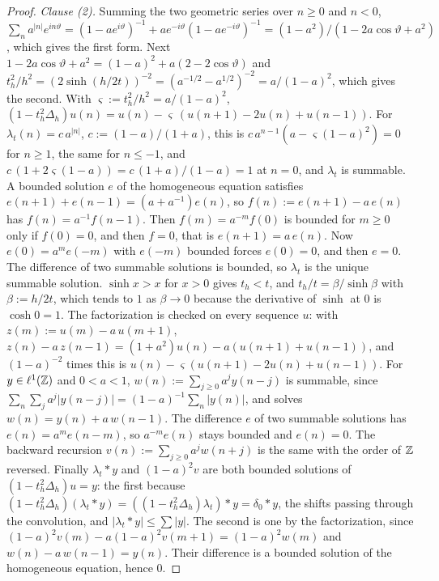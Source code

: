 \begin{proof}
\emph{Clause (2).} Summing the two geometric series over $n \ge 0$ and $n < 0$,
$\sum_na^{|n|}e^{in\vartheta} = (1 - ae^{i\vartheta})^{-1} + ae^{-i\vartheta}(1 - ae^{-i\vartheta})^{-1}
= (1-a^2)/(1 - 2a\cos\vartheta + a^2)$, which gives the first form. Next
$1 - 2a\cos\vartheta + a^2 = (1-a)^2 + a(2 - 2\cos\vartheta)$ and
$t_h^2/h^2 = (2\sinh(h/2t))^{-2} = (a^{-1/2} - a^{1/2})^{-2} = a/(1-a)^2$, which gives the second.
With $\varsigma := t_h^2/h^2 = a/(1-a)^2$,
$(1 - t_h^2\Delta_h)u(n) = u(n) - \varsigma\,(u(n+1) - 2u(n) + u(n-1))$.
For $\lambda_t(n) = c\,a^{|n|}$, $c := (1-a)/(1+a)$, this is
$c\,a^{n-1}(a - \varsigma(1-a)^2) = 0$ for $n \ge 1$, the same for $n \le -1$, and
$c\,(1 + 2\varsigma(1-a)) = c\,(1+a)/(1-a) = 1$ at $n = 0$, and $\lambda_t$ is summable. A bounded
solution $e$ of the homogeneous equation satisfies $e(n+1) + e(n-1) = (a + a^{-1})e(n)$, so
$f(n) := e(n+1) - a\,e(n)$ has $f(n) = a^{-1}f(n-1)$. Then $f(m) = a^{-m}f(0)$ is bounded for
$m \ge 0$ only if $f(0) = 0$, and then $f = 0$, that is $e(n+1) = a\,e(n)$. Now $e(0) = a^me(-m)$ with
$e(-m)$ bounded forces $e(0) = 0$, and then $e = 0$. The difference of two summable solutions is
bounded, so $\lambda_t$ is the unique summable solution. $\sinh x > x$ for $x > 0$ gives $t_h < t$,
and $t_h/t = \beta/\sinh\beta$ with $\beta := h/2t$, which tends to $1$ as $\beta \to 0$ because the
derivative of $\sinh$ at $0$ is $\cosh 0 = 1$. The factorization is checked on every sequence $u$:
with $z(m) := u(m) - a\,u(m+1)$, $z(n) - a\,z(n-1) = (1 + a^2)u(n) - a(u(n+1) + u(n-1))$, and
$(1-a)^{-2}$ times this is $u(n) - \varsigma(u(n+1) - 2u(n) + u(n-1))$. For $y \in \ell^1(\mathbb{Z})$ and
$0 < a < 1$, $w(n) := \sum_{j \ge 0}a^jy(n - j)$ is summable, since
$\sum_n\sum_ja^j|y(n-j)| = (1-a)^{-1}\sum_n|y(n)|$, and solves $w(n) = y(n) + a\,w(n-1)$. The
difference $e$ of two summable solutions has $e(n) = a^me(n - m)$, so $a^{-m}e(n)$ stays bounded and
$e(n) = 0$. The backward recursion $v(n) := \sum_{j \ge 0}a^jw(n+j)$ is the same with the order of
$\mathbb{Z}$ reversed. Finally $\lambda_t * y$ and $(1-a)^2v$ are both bounded solutions of
$(1 - t_h^2\Delta_h)u = y$: the first because $(1 - t_h^2\Delta_h)(\lambda_t * y) =
((1 - t_h^2\Delta_h)\lambda_t) * y = \delta_0 * y$, the shifts passing through the convolution, and
$|\lambda_t * y| \le \sum|y|$. The second is one by the factorization, since
$(1-a)^2v(m) - a(1-a)^2v(m+1) = (1-a)^2w(m)$ and $w(n) - a\,w(n-1) = y(n)$. Their difference is a
bounded solution of the homogeneous equation, hence $0$.
\end{proof}

